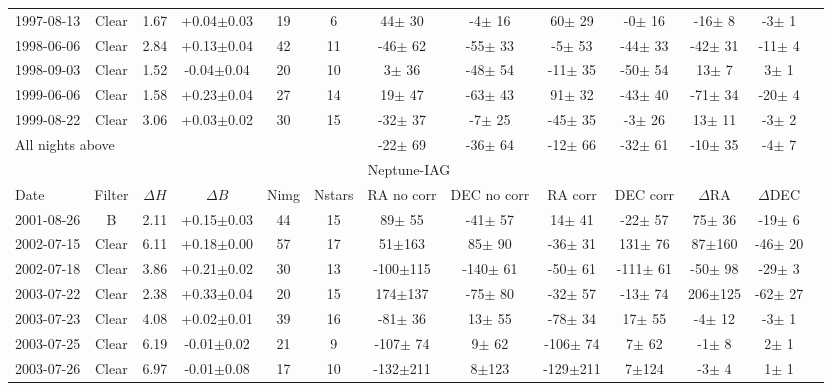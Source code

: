 \documentclass[12pt,a4paper]{report}
\begin{document}
\begin{landscape}
\begin{longtable}{|l|c|c|c|c|c|c|c|c|c|c|c|c|}
1997-08-13 & Clear & 1.67 & +0.04$\pm$0.03 &  19 &   6 &   44$\pm$ 30 &   -4$\pm$ 16 &   60$\pm$ 29 &   -0$\pm$ 16 &  -16$\pm$  8 &   -3$\pm$  1 \\ 
1998-06-06 & Clear & 2.84 & +0.13$\pm$0.04 &  42 &  11 &  -46$\pm$ 62 &  -55$\pm$ 33 &   -5$\pm$ 53 &  -44$\pm$ 33 &  -42$\pm$ 31 &  -11$\pm$  4 \\ 
1998-09-03 & Clear & 1.52 & -0.04$\pm$0.04 &  20 &  10 &    3$\pm$ 36 &  -48$\pm$ 54 &  -11$\pm$ 35 &  -50$\pm$ 54 &   13$\pm$  7 &    3$\pm$  1 \\ 
1999-06-06 & Clear & 1.58 & +0.23$\pm$0.04 &  27 &  14 &   19$\pm$ 47 &  -63$\pm$ 43 &   91$\pm$ 32 &  -43$\pm$ 40 &  -71$\pm$ 34 &  -20$\pm$  4 \\ 
1999-08-22 & Clear & 3.06 & +0.03$\pm$0.02 &  30 &  15 &  -32$\pm$ 37 &   -7$\pm$ 25 &  -45$\pm$ 35 &   -3$\pm$ 26 &   13$\pm$ 11 &   -3$\pm$  2 \\ 
\hline
\multicolumn{6}{|l|}{All nights above} & -22$\pm$ 69 &  -36$\pm$ 64 &  -12$\pm$ 66 &  -32$\pm$ 61 &  -10$\pm$ 35 &   -4$\pm$  7 \\
\hline
\multicolumn{12}{|c|}{Neptune-IAG}\\
Date & Filter & $\Delta H$ & $\Delta B$ & Nimg & Nstars & RA no corr & DEC no corr & RA corr & DEC corr & $\Delta$RA & $\Delta$DEC \\
\hline
2001-08-26 & B     & 2.11 & +0.15$\pm$0.03 &  44 &  15 &   89$\pm$ 55 &  -41$\pm$ 57 &   14$\pm$ 41 &  -22$\pm$ 57 &   75$\pm$ 36 &  -19$\pm$  6 \\ 
2002-07-15 & Clear & 6.11 & +0.18$\pm$0.00 &  57 &  17 &   51$\pm$163 &   85$\pm$ 90 &  -36$\pm$ 31 &  131$\pm$ 76 &   87$\pm$160 &  -46$\pm$ 20 \\ 
2002-07-18 & Clear & 3.86 & +0.21$\pm$0.02 &  30 &  13 & -100$\pm$115 & -140$\pm$ 61 &  -50$\pm$ 61 & -111$\pm$ 61 &  -50$\pm$ 98 &  -29$\pm$  3 \\ 
2003-07-22 & Clear & 2.38 & +0.33$\pm$0.04 &  20 &  15 &  174$\pm$137 &  -75$\pm$ 80 &  -32$\pm$ 57 &  -13$\pm$ 74 &  206$\pm$125 &  -62$\pm$ 27 \\ 
2003-07-23 & Clear & 4.08 & +0.02$\pm$0.01 &  39 &  16 &  -81$\pm$ 36 &   13$\pm$ 55 &  -78$\pm$ 34 &   17$\pm$ 55 &   -4$\pm$ 12 &   -3$\pm$  1 \\ 
2003-07-25 & Clear & 6.19 & -0.01$\pm$0.02 &  21 &   9 & -107$\pm$ 74 &    9$\pm$ 62 & -106$\pm$ 74 &    7$\pm$ 62 &   -1$\pm$  8 &    2$\pm$  1 \\ 
2003-07-26 & Clear & 6.97 & -0.01$\pm$0.08 &  17 &  10 & -132$\pm$211 &    8$\pm$123 & -129$\pm$211 &    7$\pm$124 &   -3$\pm$  4 &    1$\pm$  1 \\ 

\end{longtable}
\end{landscape}
\end{document}
